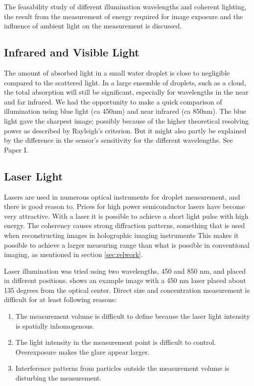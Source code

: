 The feasability study of different illumination wavelengths and coherent lighting, the result from the measurement of energy required for image exposure and the influence of ambient light on the measurement is discussed.

\subsection{Infrared and Visible Light}

The amount of absorbed light in a small water droplet is close to negligible compared to the scattered light. In a large ensemble of droplets, such as a cloud, the total absorption will still be significant, especially for wavelengths in the near and far infrared. We had the opportunity to make a quick comparison of illumination using blue light (ca 450nm) and near infrared (ca 850nm). The blue light gave the sharpest image; possibly because of the higher theoretical resolving power as described by Rayleigh's criterion. But it might also partly be explained by the difference in the sensor's sensitivity for the different wavelengths. See Paper I.

\subsection{Laser Light}
\label{sec:discussionlaser}

Lasers are used in numerous optical instruments for droplet measurement, and there is good reason to. Prices for high power semiconductor lasers have become very attractive. With a laser it is possible to achieve a short light pulse with high energy. The coherency causes strong diffraction patterns, something that is used when reconstructing images in holographic imaging instruments This makes it possible to achieve a larger measuring range than what is possible in conventional imaging, as mentioned in section \ref{sec:relwork}.
 
Laser illumination was tried using two wavelengths, 450 and 850 nm, and placed in different positions.  shows an example image with a 450 nm laser placed about 135 degrees from the optical center. Direct size and concentration measurement is difficult for at least following reasons: 
\begin{enumerate}
\item The measurement volume is difficult to define because the laser light intensity is spatially inhomogenous.
\item The light intensity in the measurement point is difficult to control. Overexposure makes the glare appear larger.
\item Interference patterns from particles outside the measurement volume is disturbing the measurement.
\end{enumerate}

